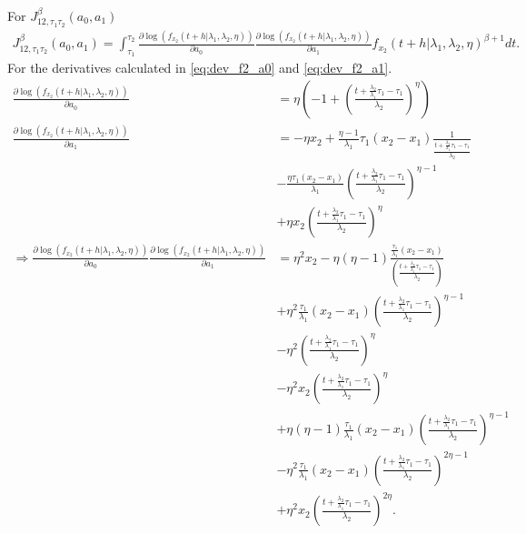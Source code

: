 \documentclass{article}
\begin{document}
For $J_{12,\tau_1\tau_2}^{\beta}(a_0,a_1)$
\begin{align*}
J_{12,\tau_1\tau_2}^{\beta}(a_0,a_1)=\int_{\tau_1}^{\tau_2}\frac{\partial \log\left(f_{x_2}(t+h|\lambda_1,\lambda_2,\eta)\right)}{\partial a_0}\frac{\partial \log\left(f_{x_2}(t+h|\lambda_1,\lambda_2,\eta)\right)}{\partial a_1}f_{x_2}(t+h|\lambda_1,\lambda_2,\eta)^{\beta+1}dt.
\end{align*}
For the derivatives calculated in \eqref{eq:dev_f2_a0} and \eqref{eq:dev_f2_a1}.
\begin{align*}
\frac{\partial \log\left(f_{x_2}(t+h|\lambda_1,\lambda_2,\eta)\right)}{\partial a_0}&=\eta\left(-1+\left(\frac{t+\frac{\lambda_2}{\lambda_1}\tau_1-\tau_1}{\lambda_2}\right)^{\eta}\right)
\\
\frac{\partial \log\left(f_{x_2}(t+h|\lambda_1,\lambda_2,\eta)\right)}{\partial a_1}&=-\eta x_2 + \frac{\eta-1}{\lambda_1}\tau_1(x_2-x_1)\frac{1}{\frac{t+\frac{\lambda_2}{\lambda_1}\tau_1-\tau_1}{\lambda_2}}
\\
&-\frac{\eta\tau_1(x_2-x_1)}{\lambda_1}\left(\frac{t+\frac{\lambda_2}{\lambda_1}\tau_1-\tau_1}{\lambda_2}\right)^{\eta-1}
\\
&+\eta x_2 \left(\frac{t+\frac{\lambda_2}{\lambda_1}\tau_1-\tau_1}{\lambda_2}\right)^{\eta}
\\
\Rightarrow \frac{\partial \log\left(f_{x_2}(t+h|\lambda_1,\lambda_2,\eta)\right)}{\partial a_0}\frac{\partial \log\left(f_{x_2}(t+h|\lambda_1,\lambda_2,\eta)\right)}{\partial a_1}&=\eta^2x_2-\eta(\eta-1)\frac{\frac{\tau_1}{\lambda_1}(x_2-x_1)}{\left(\frac{t+\frac{\lambda_2}{\lambda_1}\tau_1-\tau_1}{\lambda_2}\right)}
\\
&+\eta^2\frac{\tau_1}{\lambda_1}(x_2-x_1)\left(\frac{t+\frac{\lambda_2}{\lambda_1}\tau_1-\tau_1}{\lambda_2}\right)^{\eta-1}
\\
&-\eta^2\left(\frac{t+\frac{\lambda_2}{\lambda_1}\tau_1-\tau_1}{\lambda_2}\right)^{\eta}
\\
&-\eta^2x_2\left(\frac{t+\frac{\lambda_2}{\lambda_1}\tau_1-\tau_1}{\lambda_2}\right)^{\eta}
\\
&+\eta(\eta-1)\frac{\tau_1}{\lambda_1}(x_2-x_1)\left(\frac{t+\frac{\lambda_2}{\lambda_1}\tau_1-\tau_1}{\lambda_2}\right)^{\eta-1}
\\
&-\eta^2\frac{\tau_1}{\lambda_1}(x_2-x_1)\left(\frac{t+\frac{\lambda_2}{\lambda_1}\tau_1-\tau_1}{\lambda_2}\right)^{2\eta-1}
\\
&+\eta^2x_2\left(\frac{t+\frac{\lambda_2}{\lambda_1}\tau_1-\tau_1}{\lambda_2}\right)^{2\eta}.
\end{align*}
\end{document}
